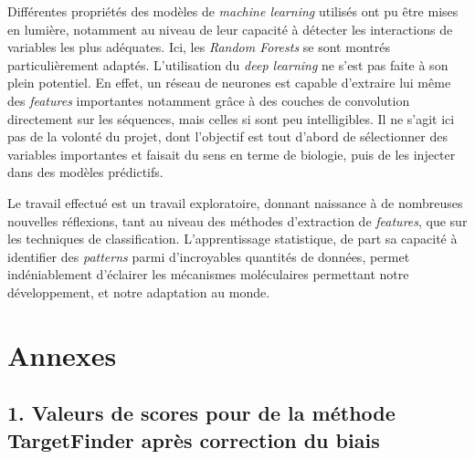 \documentclass[french]{llncs}
\begin{document}
Différentes propriétés des modèles de \textit{machine learning} utilisés ont pu être mises en lumière, notamment au niveau de leur capacité à détecter les interactions de variables les plus adéquates. Ici, les \textit{Random Forests} se sont montrés particulièrement adaptés. L'utilisation du \textit{deep learning} ne s'est pas faite à son plein potentiel. En effet, un réseau de neurones est capable d'extraire lui même des \textit{features} importantes notamment grâce à des couches de convolution directement sur les séquences, mais celles si sont peu intelligibles. Il ne s'agit ici pas de la volonté du projet, dont l'objectif est tout d'abord de sélectionner des variables importantes et faisait du sens en terme de biologie, puis de les injecter dans des modèles prédictifs.


Le travail effectué est un travail exploratoire, donnant naissance à de nombreuses nouvelles réflexions, tant au niveau des méthodes d'extraction de \textit{features}, que sur les techniques de classification. L'apprentissage statistique, de part sa capacité à identifier des \textit{patterns} parmi d'incroyables quantités de données, permet indéniablement d'éclairer les mécanismes moléculaires permettant notre développement, et notre adaptation au monde.



\clearpage\thispagestyle{empty}\addtocounter{page}{-1} 

 

 \newpage
 \appendix
\section*{Annexes}

\subsection*{1. Valeurs de scores pour de la méthode TargetFinder après correction du biais}
\end{document}
